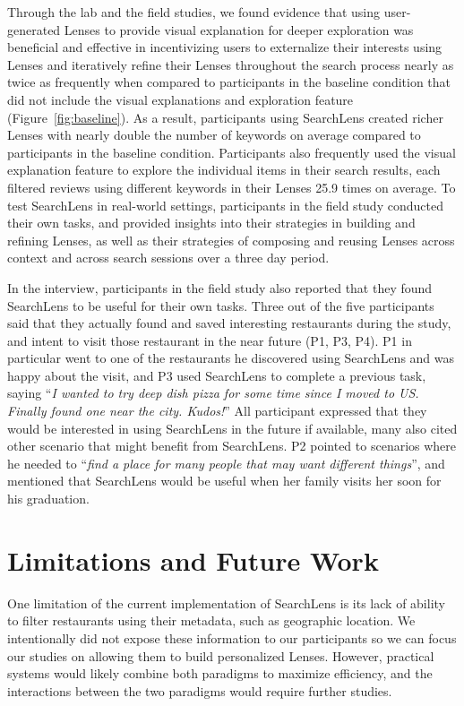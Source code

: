\documentclass{sigchi}
\begin{document}
Through the lab and the field studies, we found evidence that using user-generated Lenses to provide visual explanation for deeper exploration was beneficial and effective in incentivizing users to externalize their interests using Lenses and iteratively refine their Lenses throughout the search process nearly as twice as frequently when compared to participants in the baseline condition that did not include the visual explanations and exploration feature (Figure~\ref{fig:baseline}).  As a result, participants using SearchLens created richer Lenses with nearly double the number of keywords on average compared to participants in the baseline condition. Participants also frequently used the visual explanation feature to explore the individual items in their search results, each filtered reviews using different keywords in their Lenses 25.9 times on average. To test SearchLens in real-world settings, participants in the field study conducted their own tasks, and provided insights into their strategies in building and refining Lenses, as well as their strategies of composing and reusing Lenses across context and across search sessions over a three day period.

In the interview, participants in the field study also reported that they found SearchLens to be useful for their own tasks.
Three out of the five participants said that they actually found and saved interesting restaurants during the study, and intent to visit those restaurant in the near future (P1, P3, P4). P1 in particular went to one of the restaurants he discovered using SearchLens and was happy about the visit, and P3 used SearchLens to complete a previous task, saying ``\emph{I wanted to try deep dish pizza for some time since I moved to US. Finally found one near the city. Kudos!}'' All participant expressed that they would be interested in using SearchLens in the future if available, many also cited other scenario that might benefit from SearchLens.
P2 pointed to scenarios where he needed to ``\emph{find a place for many people that may want different things}'', and mentioned that SearchLens would be useful when her family visits her soon for his graduation.


\section{Limitations and Future Work}

One limitation of the current implementation of SearchLens is its lack of ability to filter restaurants using their metadata, such as geographic location. We intentionally did not expose these information to our participants so we can focus our studies on allowing them to build personalized Lenses. However, practical systems would likely combine both paradigms to maximize efficiency, and the interactions between the two paradigms would require further studies.
\end{document}
